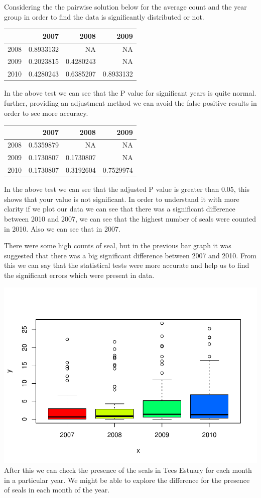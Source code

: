 \documentclass[
]{article}
\begin{document}
Considering the the pairwise solution below for the average count and
the year group in order to find the data is significantly distributed or
not.

\begin{longtable}[]{@{}lrrr@{}}
\toprule
& 2007 & 2008 & 2009\tabularnewline
\midrule
\endhead
2008 & 0.8933132 & NA & NA\tabularnewline
2009 & 0.2023815 & 0.4280243 & NA\tabularnewline
2010 & 0.4280243 & 0.6385207 & 0.8933132\tabularnewline
\bottomrule
\end{longtable}

In the above test we can see that the P value for significant years is
quite normal. further, providing an adjustment method we can avoid the
false positive results in order to see more accuracy.

\begin{longtable}[]{@{}lrrr@{}}
\toprule
& 2007 & 2008 & 2009\tabularnewline
\midrule
\endhead
2008 & 0.5359879 & NA & NA\tabularnewline
2009 & 0.1730807 & 0.1730807 & NA\tabularnewline
2010 & 0.1730807 & 0.3192604 & 0.7529974\tabularnewline
\bottomrule
\end{longtable}

In the above test we can see that the adjusted P value is greater than
0.05, this shows that your value is not significant. In order to
understand it with more clarity if we plot our data we can see that
there was a significant difference between 2010 and 2007, we can see
that the highest number of seals were counted in 2010. Also we can see
that in 2007.

There were some high counts of seal, but in the previous bar graph it
was suggested that there was a big significant difference between 2007
and 2010. From this we can say that the statistical tests were more
accurate and help us to find the significant errors which were present
in data.

\includegraphics{Statistical-analysis-in-RStudio_files/figure-latex/unnamed-chunk-9-1.pdf}
After this we can check the presence of the seals in Tees Estuary for
each month in a particular year. We might be able to explore the
difference for the presence of seals in each month of the year.
\end{document}
